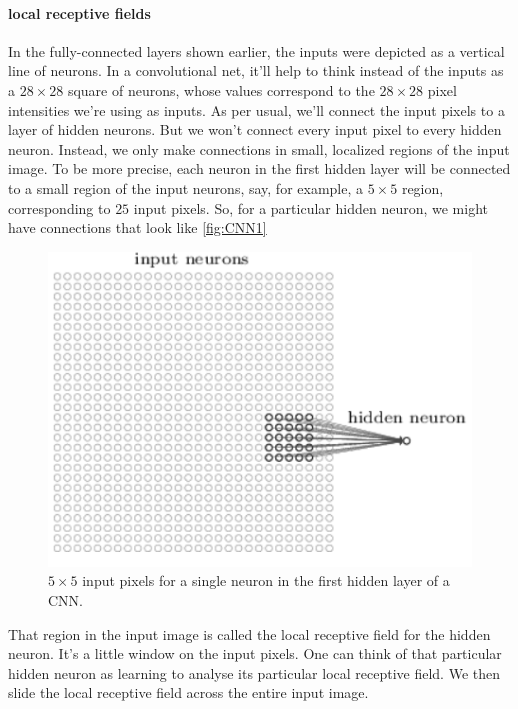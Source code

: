 \documentclass[12pt, letterpaper]{article}
\theoremstyle{definition}
\let\tb\textbf
\begin{document}
\paragraph{\tb{local receptive fields}} In the fully-connected layers shown earlier, the inputs were depicted as a vertical line of neurons. In a convolutional net, it'll help to think instead of the inputs as a $28\times 28$ square of neurons, whose values correspond to the $28\times 28$ pixel intensities we're using as inputs. As per usual, we'll connect the input pixels to a layer of hidden neurons. But we won't connect every input pixel to every hidden neuron. Instead, we only make connections in small, localized regions of the input image. To be more precise, each neuron in the first hidden layer will be connected to a small region of the input neurons, say, for example, a $5\times5$ region, corresponding to $25$ input pixels. So, for a particular hidden neuron, we might have connections that look like \autoref{fig:CNN1}
\begin{figure}
\centering
\includegraphics[scale=0.5]{img/CNN1}
\caption{$5\times 5$ input pixels for a single neuron in the first hidden layer of a CNN.}
\label{fig:CNN1}
\end{figure}
That region in the input image is called the local receptive field for the hidden neuron. It's a little window on the input pixels. One can think of that particular hidden neuron as learning to analyse its particular local receptive field. We then slide the local receptive field across the entire input image.
\end{document}
